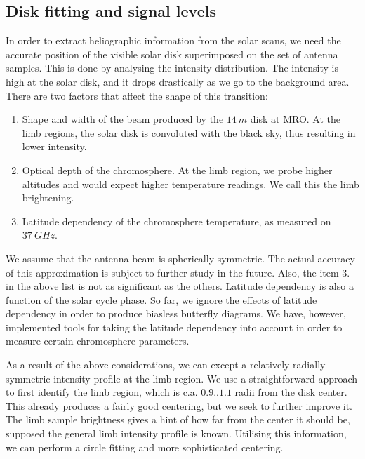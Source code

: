 \documentclass{aa}
\begin{document}
  \subsection{Disk fitting and signal levels} \label{sect:disk}

In order to extract heliographic information from the solar scans, we need the accurate position of the visible solar disk superimposed on the set of antenna samples. This is done by analysing the intensity distribution. The intensity is high at the solar disk, and it drops drastically as we go to the background area. There are two factors that affect the shape of this transition:
\begin{enumerate}
\item Shape and width of the beam produced by the $\SI{14}{m}$ disk at MRO. At the limb regions, the solar disk is convoluted with the black sky, thus resulting in lower intensity.
\item Optical depth of the chromosphere. At the limb region, we probe higher altitudes and would expect higher temperature readings. We call this the limb brightening.
\item Latitude dependency of the chromosphere temperature, as measured on $\SI{37}{GHz}$.
\end{enumerate}

We assume that the antenna beam is spherically symmetric. The actual accuracy of this approximation is subject to 
further study in the future. Also, the item 3. in the above list is not as significant as the others. Latitude 
dependency is also a function of the solar cycle phase. So far, we ignore the effects of latitude dependency in order to 
produce biasless butterfly diagrams. We have, however, implemented tools for taking the latitude dependency into account 
in order to measure certain chromosphere parameters.

As a result of the above considerations, we can except a relatively radially symmetric intensity profile at the limb 
region. We use a straightforward approach to first identify the limb region, which is c.a. $0.9 .. 1.1$ radii from the 
disk center. This already produces a fairly good centering, but we seek to further improve it. The limb sample 
brightness gives a hint of how far from the center it should be, supposed the general limb intensity profile is known. 
Utilising this information, we can perform a circle fitting and more sophisticated centering.
\end{document}
